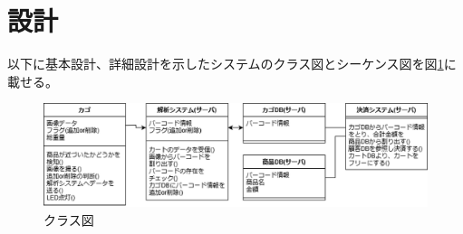 \section{設計}
以下に基本設計、詳細設計を示したシステムのクラス図\cite{v_model}とシーケンス図\cite{sequence}を図\ref{class}に載せる。
\begin{figure}[htbp]
\centering
\includegraphics[width=15cm]{./pic/class_final.eps}
\caption{クラス図}
\label{class}
\end{figure}

